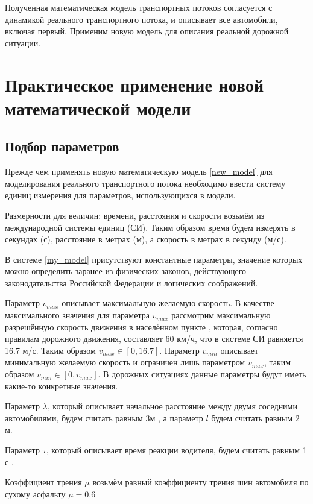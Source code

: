 \documentclass[12pt, a4paper]{extarticle}
\numberwithin{equation}{section}
\numberwithin{figure}{section}
\begin{document}
Полученная математическая модель транспортных потоков согласуется с динамикой реального транспортного потока, и описывает все автомобили, включая первый. Применим новую модель для описания реальной дорожной ситуации.

\section{Практическое применение новой математической модели} 

\subsection{Подбор параметров} 

Прежде чем применять новую математическую модель \eqref{new_model} для моделирования реального транспортного потока необходимо ввести систему единиц измерения для параметров, использующихся в модели.

Размерности для величин: времени, расстояния и скорости возьмём из международной системы единиц (СИ). Таким образом время будем измерять в секундах (с), расстояние в метрах (м), а скорость в метрах в секунду (м/с).

В системе \eqref{my_model} присутствуют константные параметры, значение которых можно определить заранее из физических законов, действующего законодательства Российской Федерации и логических соображений.

Параметр $v_{max}$ описывает максимальную желаемую скорость. В качестве максимального значения для параметра $v_{max}$ рассмотрим максимальную разрешённую скорость движения в населённом пункте \cite{PDD}, которая, согласно правилам дорожного движения, составляет 60 км/ч, что в системе СИ равняется 16.7 м/с. Таким образом $v_{max} \in [0,16.7]$. Параметр $v_{min}$ описывает минимальную желаемую скорость и ограничен лишь параметром $v_{max}$, таким образом $v_{min} \in [0,v_{max}]$. В дорожных ситуациях данные параметры будут иметь какие-то конкретные значения.

Параметр $\lambda$, который описывает начальное расстояние между двумя соседними автомобилями, будем считать равным 3м \cite{PDD}, а параметр $l$ будем считать равным 2 м.

Параметр $\tau$, который описывает время реакции водителя, будем считать равным 1 с \cite{PDD}.

Коэффициент трения $\mu$ возьмём равный коэффициенту трения шин автомобиля по сухому асфальту $\mu=0.6$ \cite{Physics}
\end{document}
